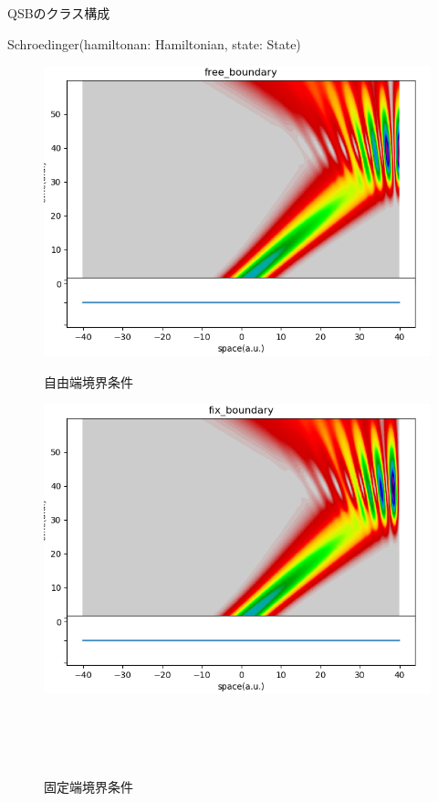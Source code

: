 \documentclass[a4paper, lualatex]{bxjsarticle}
\begin{document}
\begin{section}{QSBのクラス構成\label{AppQ}}
\begin{subsection}{Schroedinger(hamiltonan: Hamiltonian, state: State)}
\begin{figure}[h]
\begin{minipage}{0.5\hsize}
                \includegraphics[width=0.9\hsize]{free_boundary.png}
                \caption{自由端境界条件}
                \label{free}
            \end{minipage}
            \begin{minipage}{0.5\hsize}
                \centering
                \includegraphics[width=0.9\hsize]{fix_boundary.png}
                \caption{固定端境界条件}
                \label{fix}
            \end{minipage}\\\\\\
            \begin{minipage}{0.5\hsize}
                \centering

\end{minipage}
\end{figure}
\end{subsection}
\end{section}
\end{document}
